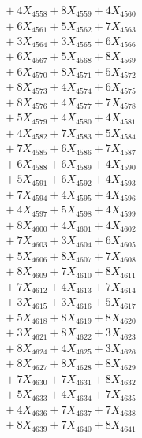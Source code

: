 \documentclass[a4paper,10pt]{article}
\begin{document}
{\begin{align}
&\;  + 4 X_{4558} + 8 X_{4559} + 4 X_{4560} \\[0.3ex]
&\;  + 6 X_{4561} + 5 X_{4562} + 7 X_{4563} \\[0.3ex]
&\;  + 3 X_{4564} + 3 X_{4565} + 6 X_{4566} \\[0.3ex]
&\;  + 6 X_{4567} + 5 X_{4568} + 8 X_{4569} \\[0.5ex]\allowbreak
&\;  + 6 X_{4570} + 8 X_{4571} + 5 X_{4572} \\[0.3ex]
&\;  + 8 X_{4573} + 4 X_{4574} + 6 X_{4575} \\[0.3ex]
&\;  + 8 X_{4576} + 4 X_{4577} + 7 X_{4578} \\[0.3ex]
&\;  + 5 X_{4579} + 4 X_{4580} + 4 X_{4581} \\[0.3ex]
&\;  + 4 X_{4582} + 7 X_{4583} + 5 X_{4584} \\[0.3ex]
&\;  + 7 X_{4585} + 6 X_{4586} + 7 X_{4587} \\[0.3ex]
&\;  + 6 X_{4588} + 6 X_{4589} + 4 X_{4590} \\[0.3ex]
&\;  + 5 X_{4591} + 6 X_{4592} + 4 X_{4593} \\[0.3ex]
&\;  + 7 X_{4594} + 4 X_{4595} + 4 X_{4596} \\[0.3ex]
&\;  + 4 X_{4597} + 5 X_{4598} + 4 X_{4599} \\[0.5ex]\allowbreak
&\;  + 8 X_{4600} + 4 X_{4601} + 4 X_{4602} \\[0.3ex]
&\;  + 7 X_{4603} + 3 X_{4604} + 6 X_{4605} \\[0.3ex]
&\;  + 5 X_{4606} + 8 X_{4607} + 7 X_{4608} \\[0.3ex]
&\;  + 8 X_{4609} + 7 X_{4610} + 8 X_{4611} \\[0.3ex]
&\;  + 7 X_{4612} + 4 X_{4613} + 7 X_{4614} \\[0.3ex]
&\;  + 3 X_{4615} + 3 X_{4616} + 5 X_{4617} \\[0.3ex]
&\;  + 5 X_{4618} + 8 X_{4619} + 8 X_{4620} \\[0.3ex]
&\;  + 3 X_{4621} + 8 X_{4622} + 3 X_{4623} \\[0.3ex]
&\;  + 8 X_{4624} + 4 X_{4625} + 3 X_{4626} \\[0.3ex]
&\;  + 8 X_{4627} + 8 X_{4628} + 8 X_{4629} \\[0.5ex]\allowbreak
&\;  + 7 X_{4630} + 7 X_{4631} + 8 X_{4632} \\[0.3ex]
&\;  + 5 X_{4633} + 4 X_{4634} + 7 X_{4635} \\[0.3ex]
&\;  + 4 X_{4636} + 7 X_{4637} + 7 X_{4638} \\[0.3ex]
&\;  + 8 X_{4639} + 7 X_{4640} + 8 X_{4641} \\[0.3ex]

\end{align}}
\end{document}
